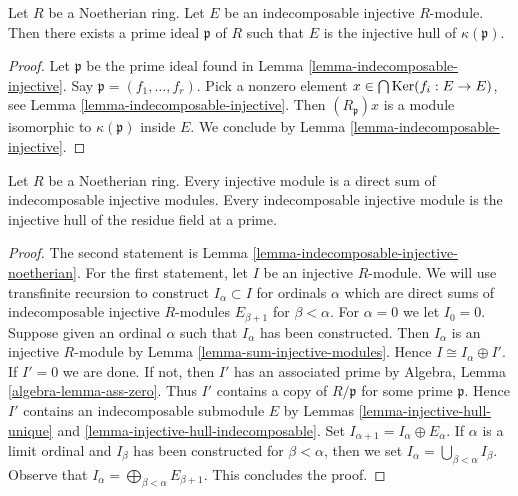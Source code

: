 \begin{lemma}
\label{lemma-indecomposable-injective-noetherian}
Let $R$ be a Noetherian ring. Let $E$ be an indecomposable injective
$R$-module. Then there exists a prime ideal $\mathfrak p$ of $R$ such that
$E$ is the injective hull of $\kappa(\mathfrak p)$.
\end{lemma}

\begin{proof}
Let $\mathfrak p$ be the prime ideal found in
Lemma \ref{lemma-indecomposable-injective}.
Say $\mathfrak p = (f_1, \ldots, f_r)$.
Pick a nonzero element $x \in \bigcap \mathop{\mathrm{Ker}}(f_i : E \to E)$,
see Lemma \ref{lemma-indecomposable-injective}.
Then $(R_\mathfrak p)x$ is a module isomorphic to $\kappa(\mathfrak p)$
inside $E$. We conclude by Lemma \ref{lemma-indecomposable-injective}.
\end{proof}

\begin{proposition}
\label{proposition-structure-injectives-noetherian}
Let $R$ be a Noetherian ring.
Every injective module is a direct sum of indecomposable injective modules.
Every indecomposable injective module is the injective hull of
the residue field at a prime.
\end{proposition}

\begin{proof}
The second statement is Lemma \ref{lemma-indecomposable-injective-noetherian}.
For the first statement, let $I$ be an injective $R$-module.
We will use transfinite recursion to construct $I_\alpha \subset I$
for ordinals $\alpha$ which are direct sums of indecomposable injective
$R$-modules $E_{\beta + 1}$ for $\beta < \alpha$.
For $\alpha = 0$ we let $I_0 = 0$. Suppose given an ordinal $\alpha$
such that $I_\alpha$ has been constructed. Then $I_\alpha$ is an
injective $R$-module by Lemma \ref{lemma-sum-injective-modules}.
Hence $I \cong I_\alpha \oplus I'$. If $I' = 0$ we are done.
If not, then $I'$ has an associated prime by
Algebra, Lemma \ref{algebra-lemma-ass-zero}.
Thus $I'$ contains a copy of $R/\mathfrak p$ for some prime $\mathfrak p$.
Hence $I'$ contains an indecomposable submodule $E$ by
Lemmas \ref{lemma-injective-hull-unique} and
\ref{lemma-injective-hull-indecomposable}. Set
$I_{\alpha + 1} = I_\alpha \oplus E_\alpha$.
If $\alpha$ is a limit ordinal and $I_\beta$ has been constructed
for $\beta < \alpha$, then we set
$I_\alpha = \bigcup_{\beta < \alpha} I_\beta$.
Observe that $I_\alpha = \bigoplus_{\beta < \alpha} E_{\beta + 1}$.
This concludes the proof.
\end{proof}



